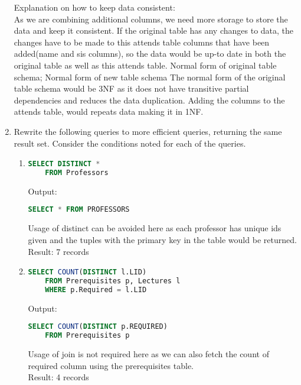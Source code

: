 \begin{enumerate}
Explanation on how to keep data consistent:\\
As we are combining additional columns, we need more storage to store the data and 	keep it consistent. If the original table has any changes to data, the changes have to 		be made to this attends table columns that have been added(name and sis columns), 		so the data would be up-to date in both the original table as well as this attends 		table.
Normal form of original table schema; Normal form of new table schema
The normal form of the original table schema would be 3NF as it does not have transitive partial dependencies and reduces the data duplication. Adding the columns to the attends table, would repeats data making it in 1NF.

\newpage
\item
  Rewrite the following queries to more efficient queries, returning the same result set.
  Consider the conditions noted for each of the queries.

  \begin{enumerate}
  \item

    \begin{lstlisting}[language=sql]
    SELECT DISTINCT *
    FROM Professors
    \end{lstlisting}

    Output: 
    \begin{lstlisting}[language=sql]
    SELECT * FROM PROFESSORS
    \end{lstlisting}
    Usage of distinct can be avoided here as each professor has unique ids given and the tuples with the primary key in the table would be returned.\\ 
    Result: 7 records

  \item
    \begin{lstlisting}[language=sql]
    SELECT COUNT(DISTINCT l.LID)
    FROM Prerequisites p, Lectures l
    WHERE p.Required = l.LID
    \end{lstlisting}

    Output:
    \begin{lstlisting}[language=sql] 
    SELECT COUNT(DISTINCT p.REQUIRED)
    FROM Prerequisites p
    \end{lstlisting}
    Usage of join is not required here as we can also fetch the count of required column using the prerequisites table.\\

    Result: 4 records



\end{enumerate}
\end{enumerate}

